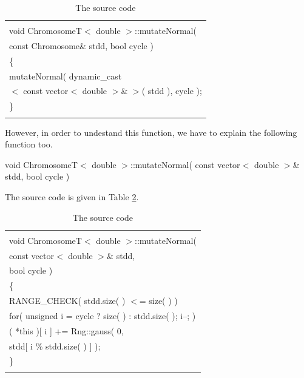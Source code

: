 \documentclass[twocolumn]{article}
\begin{document}
\begin{table}[h]
\begin{center}
\caption{The source code}
\label{SC8}
{\scriptsize
\begin{tabular}{|l|}\hline
\hspace*{7cm}\\
void ChromosomeT$<$ double $>$::mutateNormal( \\
\hspace*{4mm} const Chromosome\& stdd, bool cycle )\\
\{\\
\hspace*{4mm} mutateNormal( dynamic\_cast \\
\hspace*{8mm} $<$ const vector$<$ double $>$\& $>$( stdd ), cycle );\\
\}\\
\hspace*{7cm}\\\hline
\end{tabular}
}
\end{center}
\end{table}

\noindent
However, in order to undestand this function, we have to explain the
following function too.

\begin{center}
void ChromosomeT$<$ double $>$::mutateNormal( const vector$<$ double
$>$\& stdd, bool cycle )
\end{center}

\noindent
The source code is given in Table \ref{SC8-2}.

\begin{table}[h] 
\begin{center}
\caption{The source code}
\label{SC8-2}
{\scriptsize
\begin{tabular}{|l|}\hline
\hspace*{7cm}\\
void ChromosomeT$<$ double $>$::mutateNormal( \\
\hspace*{4mm} const vector$<$ double $>$\& stdd,\\
\hspace*{4mm} bool cycle )\\
\{\\
\hspace*{4mm} RANGE\_CHECK( stdd.size( ) $<$= size( ) )\\
\hspace*{4mm} for( unsigned i = cycle ? size( ) : stdd.size( ); i--; )\\
\hspace*{8mm} ( *this )[ i ] += Rng::gauss( 0, \\
\hspace*{12mm} stdd[ i \% stdd.size( ) ] );\\
\}\\
\hspace*{7cm}\\\hline
\end{tabular}
}
\end{center}
\end{table}
\end{document}
